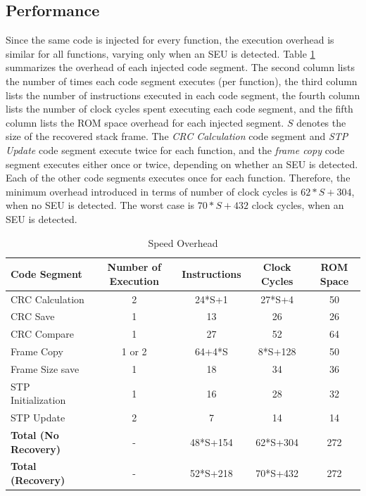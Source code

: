 \subsection{Performance}
Since the same code is injected for every function, the execution overhead is similar for all functions, varying only when an SEU is detected. Table \ref{tbl_speed_overhead} summarizes the overhead of each injected code segment. The second column lists the number of times each code segment executes (per function), the third column lists the number of instructions executed in each code segment, the fourth column lists the number of clock cycles spent executing each code segment, and the fifth column lists the ROM space overhead for each injected segment. $S$ denotes the size of the recovered stack frame. The \textit{CRC Calculation} code segment and \textit{STP Update} code segment execute twice for each function, and the \textit{frame copy} code segment executes either once or twice, depending on whether an SEU is detected. Each of the other code segments executes once for each function. Therefore, the minimum overhead introduced in terms of number of clock cycles is $62*S+304$, when no SEU is detected. The worst case is $70*S+432$ clock cycles, when an SEU is detected. 
\begin{table}
	\center
    \begin{tabular}{|l|c|c|c|c|}
    \hline
   \textbf{ Code Segment}   & \textbf{Number of Execution} & \textbf{Instructions} & \textbf{Clock Cycles} & \textbf{ROM Space}	\\ \hline
    CRC Calculation         & 2			& 24*S+1		& 27*S+4		& 50				\\ \hline
    CRC Save                & 1			& 13			& 26           	& 26				\\ \hline
    CRC Compare             & 1			& 27			& 52		   	& 64				\\ \hline
    Frame Copy				& 1 or 2	& 64+4*S		& 8*S+128      	& 50				\\ \hline
    Frame Size save         & 1			& 18			& 34           	& 36				\\ \hline
    STP Initialization		& 1			& 16			& 28		   	& 32				\\ \hline
	STP Update				& 2			& 7				& 14			& 14				\\ \hline
	\textbf{Total (No Recovery)} & -	 	& 48*S+154     	& 62*S+304		& 272  		\\ \hline
	\textbf{Total (Recovery)}& -	 		& 52*S+218     	& 70*S+432		& 272 		\\ \hline
    \end{tabular}
    \caption {Speed Overhead}
    \label{tbl_speed_overhead}
\end{table}

